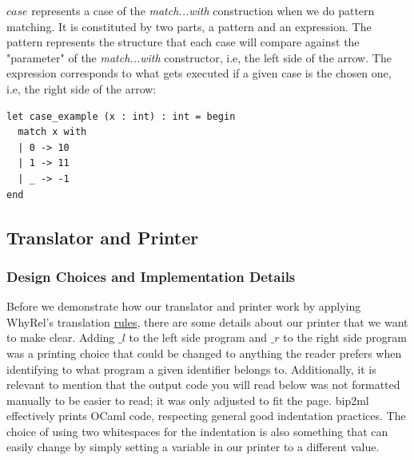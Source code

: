 $case$ represents a case of the \emph{match...with} construction when we do pattern matching.
It is constituted by two parts, a pattern and an expression.
The pattern represents the structure that each case will compare against the "parameter" of the \emph{match...with} constructor, i.e, the left side of the arrow.
The expression corresponds to what gets executed if a given case is the chosen one, i.e, the right side of the arrow:

\begin{lstlisting}[mathescape, basicstyle=\ttfamily, columns=flexible,
                    emph={type, and, let, rec, if, then, else, mod, in, for, while, do, done, to, begin, end, assert, match, with, of, open, include,ref},
                    emphstyle=\ttfamily\bfseries\color{myorange}]
let case_example (x : int) : int = begin
  match x with
  | 0 -> 10
  | 1 -> 11
  | _ -> -1 
end
\end{lstlisting}


\FloatBarrier
\subsection{Translator and Printer}
\label{subsec:translator_printer}

\subsubsection{Design Choices and Implementation Details}
\label{subsubsec:translator_printer_details}

Before we demonstrate how our translator and printer work by applying WhyRel's translation \hyperref[fig:translation-biprograms-rules]{rules}, there are some details about our printer that we want to make clear.
Adding $\_l$ to the left side program and $\_r$ to the right side program was a printing choice that could be changed to anything the reader prefers when identifying to what program a given identifier belongs to.
Additionally, it is relevant to mention that the output code you will read below was not formatted manually to be easier to read; it was only adjusted to fit the page.
bip2ml effectively prints OCaml code, respecting general good indentation practices.
The choice of using two whitespaces for the indentation is also something that can easily change by simply setting a variable in our printer to a different value.

